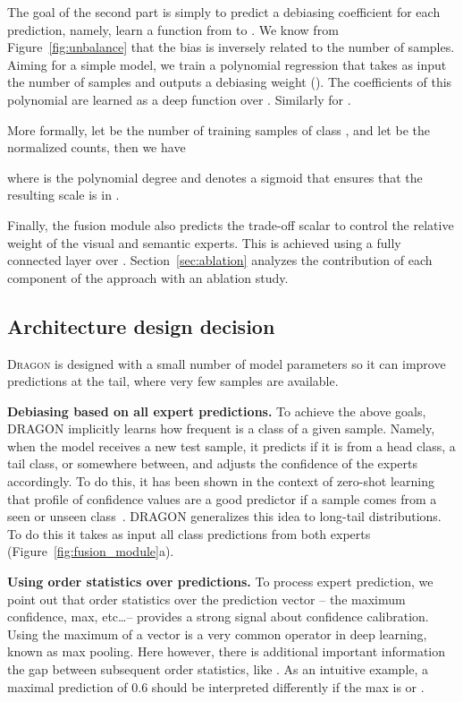 \documentclass[10pt,twocolumn,letterpaper]{article}
\newcommand{\secref}[1]{Section~\ref{#1}}
\newcommand{\figref}[1]{Figure~\ref{#1}}
\newcommand{\DRAGON}{\textsc{Dragon}}
\begin{document}
The goal of the second part is simply to predict a debiasing coefficient for each prediction, namely, learn a function from  to . We know from \figref{fig:unbalance} that the bias is inversely related to the number of samples. Aiming for a simple model, we train a polynomial regression that takes as input the number of samples and outputs a debiasing weight (). The coefficients of this polynomial  are learned as a deep function over . Similarly for . 

More formally, let  be the number of training samples of class , and let  be the normalized counts, then we have

where  is the polynomial degree and  denotes a sigmoid that ensures that the resulting scale is in .

Finally, the fusion module also predicts the trade-off scalar  to control the relative weight of the visual and semantic experts. This is achieved using a fully connected layer over . \secref{sec:ablation} analyzes the contribution of each component of the approach with an ablation study. 


\subsection{Architecture design decision}
\label{appendix:more-intuition}
\DRAGON{} is designed with a small number of model parameters so it can improve predictions at the tail, where very few samples are available.


\textbf{Debiasing based on all expert predictions.}
To achieve the above goals, DRAGON implicitly learns how frequent is a class of a given sample. Namely, when the model receives a new test sample, it predicts if it is from a head class, a tail class, or somewhere between, and adjusts the confidence of the experts accordingly. To do this, it has been shown in the context of zero-shot learning that profile of confidence values are a good predictor if a sample comes from a seen or unseen class~\cite{Atzmon2018AdaptiveCS}. DRAGON generalizes this idea to long-tail distributions. To do this it takes as input all class predictions from both experts (\figref{fig:fusion_module}a). 

\textbf{Using order statistics over predictions.} To process expert prediction, we point out that order statistics over the prediction vector -- the maximum confidence,  max, etc\dots -- provides a strong signal about confidence calibration. Using the maximum of a vector is a very common operator in deep learning, known as max pooling. Here however, there is additional important information the gap between subsequent order statistics, like . As an intuitive example, a maximal prediction of 0.6 should be interpreted differently if the  max is  or . 
\end{document}
